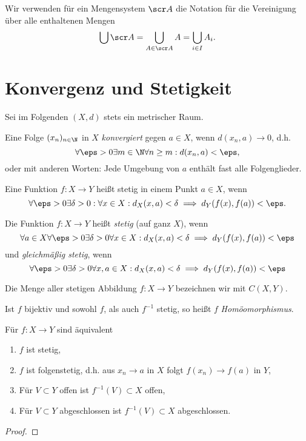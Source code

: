 
\begin{nt}
	Wir verwenden für ein Mengensystem $\scr A$ die Notation für die Vereinigung über alle enthaltenen Mengen
	\[
		\bigcup \scr A
		= \bigcup_{A \in \scr A} A
		= \bigcup_{i\in I} A_i.
	\]
\end{nt}


\section{Konvergenz und Stetigkeit}

Sei im Folgenden $(X,d)$ stets ein metrischer Raum.

\begin{df}
	Eine Folge $(x_n)_{n\in \N}$ in $X$ \emph{konvergiert} gegen $a \in X$, wenn $d(x_n, a) \to 0$, d.h.
	\[
		\forall \eps > 0 \exists m \in \N \forall n \ge m : d(x_n, a) < \eps,
	\]
	oder mit anderen Worten: Jede Umgebung von $a$ enthält fast alle Folgenglieder.
\end{df}

\begin{df}
	Eine Funktion $f: X \to Y$ heißt stetig in einem Punkt $a \in X$, wenn
	\[
		\forall \eps > 0 \exists \delta > 0 : \forall x \in X : d_X(x,a) < \delta \implies d_Y(f(x), f(a)) < \eps.
	\]

	Die Funktion $f: X \to Y$ heißt \emph{stetig} (auf ganz $X$), wenn
	\[
		\forall a \in X \forall \eps > 0 \exists \delta > 0 \forall x \in X: d_X(x,a) < \delta \implies d_Y(f(x), f(a)) < \eps
	\]
	und \emph{gleichmäßig stetig}, wenn
	\[
		\forall \eps > 0 \exists \delta > 0 \forall x,a \in X: d_X(x,a) < \delta \implies d_Y(f(x), f(a)) < \eps
	\]

	Die Menge aller stetigen Abbildung $f: X \to Y$ bezeichnen wir mit $C(X,Y)$.

	Ist $f$ bijektiv und sowohl $f$, als auch $f^{-1}$ stetig, so heißt $f$ \emph{Homöomorphismus}.
\end{df}

\begin{st}
	Für $f: X \to Y$ sind äquivalent
	\begin{enumerate}[1)]
		\item
			$f$ ist stetig,
		\item
			$f$ ist folgenstetig, d.h. aus $x_n \to a$ in $X$ folgt $f(x_n) \to f(a)$ in $Y$,
		\item
			Für $V \subset Y$ offen ist $f^{-1}(V) \subset X$ offen,
		\item
			Für $V \subset Y$ abgeschlossen ist $f^{-1}(V) \subset X$ abgeschlossen.
	\end{enumerate}
	\begin{proof}
	\end{proof}
\end{st}

